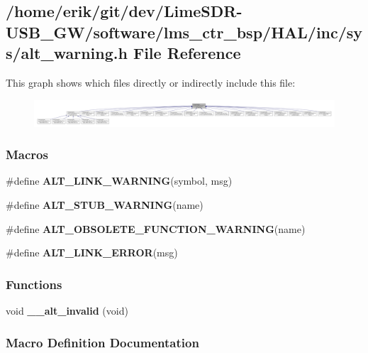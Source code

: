 \subsection{/home/erik/git/dev/\+Lime\+S\+D\+R-\/\+U\+S\+B\+\_\+\+G\+W/software/lms\+\_\+ctr\+\_\+bsp/\+H\+A\+L/inc/sys/alt\+\_\+warning.h File Reference}
\label{alt__warning_8h}
This graph shows which files directly or indirectly include this file\+:
\nopagebreak
\begin{figure}[H]
\begin{center}
\leavevmode
\includegraphics[width=350pt]{d2/d12/alt__warning_8h__dep__incl}
\end{center}
\end{figure}
\subsubsection*{Macros}
\begin{DoxyCompactItemize}
\item 
\#define {\bf A\+L\+T\+\_\+\+L\+I\+N\+K\+\_\+\+W\+A\+R\+N\+I\+NG}(symbol,  msg)
\item 
\#define {\bf A\+L\+T\+\_\+\+S\+T\+U\+B\+\_\+\+W\+A\+R\+N\+I\+NG}(name)
\item 
\#define {\bf A\+L\+T\+\_\+\+O\+B\+S\+O\+L\+E\+T\+E\+\_\+\+F\+U\+N\+C\+T\+I\+O\+N\+\_\+\+W\+A\+R\+N\+I\+NG}(name)
\item 
\#define {\bf A\+L\+T\+\_\+\+L\+I\+N\+K\+\_\+\+E\+R\+R\+OR}(msg)
\end{DoxyCompactItemize}
\subsubsection*{Functions}
\begin{DoxyCompactItemize}
\item 
void {\bf \+\_\+\+\_\+alt\+\_\+invalid} (void)
\end{DoxyCompactItemize}


\subsubsection{Macro Definition Documentation}
